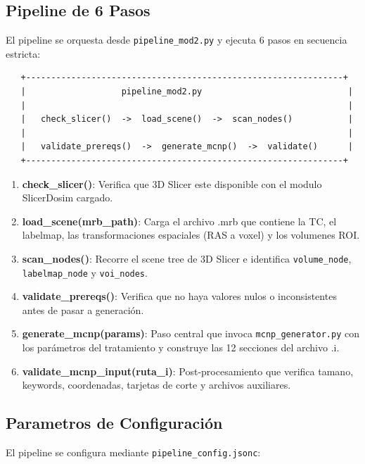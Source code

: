 \documentclass[12pt,a4paper]{article}
\begin{document}
\subsection{Pipeline de 6 Pasos}

El pipeline se orquesta desde \texttt{pipeline\_mod2.py} y ejecuta 6 pasos en secuencia estricta:

\begin{lstlisting}
   +---------------------------------------------------------------+
   |                   pipeline_mod2.py                             |
   |                                                                |
   |   check_slicer()  ->  load_scene()  ->  scan_nodes()           |
   |                                                                |
   |   validate_prereqs()  ->  generate_mcnp()  ->  validate()      |
   +---------------------------------------------------------------+
\end{lstlisting}

\begin{enumerate}
    \item \textbf{check\_slicer()}: Verifica que 3D Slicer este disponible con el modulo SlicerDosim cargado.
    \item \textbf{load\_scene(mrb\_path)}: Carga el archivo .mrb que contiene la TC, el labelmap, las transformaciones espaciales (RAS a voxel) y los volumenes ROI.
    \item \textbf{scan\_nodes()}: Recorre el scene tree de 3D Slicer e identifica \texttt{volume\_node}, \texttt{labelmap\_node} y \texttt{voi\_nodes}.
    \item \textbf{validate\_prereqs()}: Verifica que no haya valores nulos o inconsistentes antes de pasar a generación.
    \item \textbf{generate\_mcnp(params)}: Paso central que invoca \texttt{mcnp\_generator.py} con los parámetros del tratamiento y construye las 12 secciones del archivo .i.
    \item \textbf{validate\_mcnp\_input(ruta\_i)}: Post-procesamiento que verifica tamano, keywords, coordenadas, tarjetas de corte y archivos auxiliares.
\end{enumerate}

\subsection{Parametros de Configuración}

El pipeline se configura mediante \texttt{pipeline\_config.jsonc}:
\end{document}
